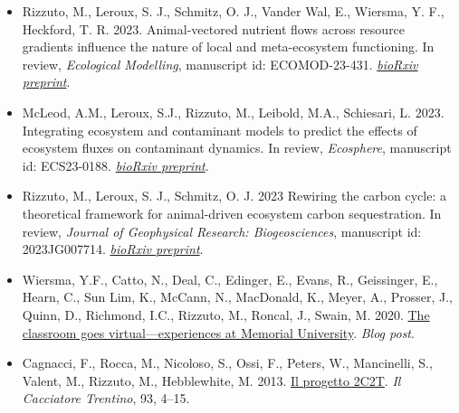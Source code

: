 
\begin{itemize}
  \item \textcolor{awesome}{Rizzuto, M.}, Leroux, S. J., Schmitz, O. J., Vander Wal, E., Wiersma, Y. F., Heckford, T. R. 2023. Animal-vectored nutrient flows across resource gradients influence the nature of local and meta-ecosystem functioning. In review, \emph{Ecological Modelling}, manuscript id: ECOMOD-23-431. \href{https://doi.org/10.1101/2023.03.03.530982}{\emph{bioRxiv preprint}}. 
  \item McLeod, A.M., Leroux, S.J., \textcolor{awesome}{Rizzuto, M.}, Leibold, M.A., Schiesari, L. 2023. Integrating ecosystem and contaminant models to predict the effects of ecosystem fluxes on contaminant dynamics. In review, \emph{Ecosphere}, manuscript id: ECS23-0188. \href{https://doi.org/10.1101/2023.07.15.549171}{\emph{bioRxiv preprint}}.
  \item \textcolor{awesome}{Rizzuto, M.}, Leroux, S. J., Schmitz, O. J. 2023 Rewiring the carbon cycle: a theoretical framework for animal-driven ecosystem carbon sequestration. In review, \emph{Journal of Geophysical Research: Biogeosciences}, manuscript id: 2023JG007714. \href{https://doi.org/10.1101/2023.07.14.549071}{\emph{bioRxiv preprint}}.
\end{itemize}


\begin{itemize}
  \item Wiersma, Y.F., Catto, N., Deal, C., Edinger, E., Evans, R., Geissinger, E., Hearn, C., Sun Lim, K., McCann, N., MacDonald, K., Meyer, A., Prosser, J., Quinn, D., Richmond, I.C., \textcolor{awesome}{Rizzuto, M.}, Roncal, J., Swain, M. 2020. \href{https://nllandscapeecology.com/blog-post-teaching-and-learning-remotely-time-to-read-4-min-45-s/}{The classroom goes virtual---experiences at Memorial University}. \emph{Blog post}.
  \item Cagnacci, F., Rocca, M., Nicoloso, S., Ossi, F., Peters, W., Mancinelli, S., Valent, M., \textcolor{awesome}{Rizzuto, M.}, Hebblewhite, M. 2013. \href{https://en.calameo.com/read/00214567355b1384f96d0}{Il progetto 2C2T}. \emph{Il Cacciatore Trentino}, 93, 4--15.
\end{itemize}


  


  
